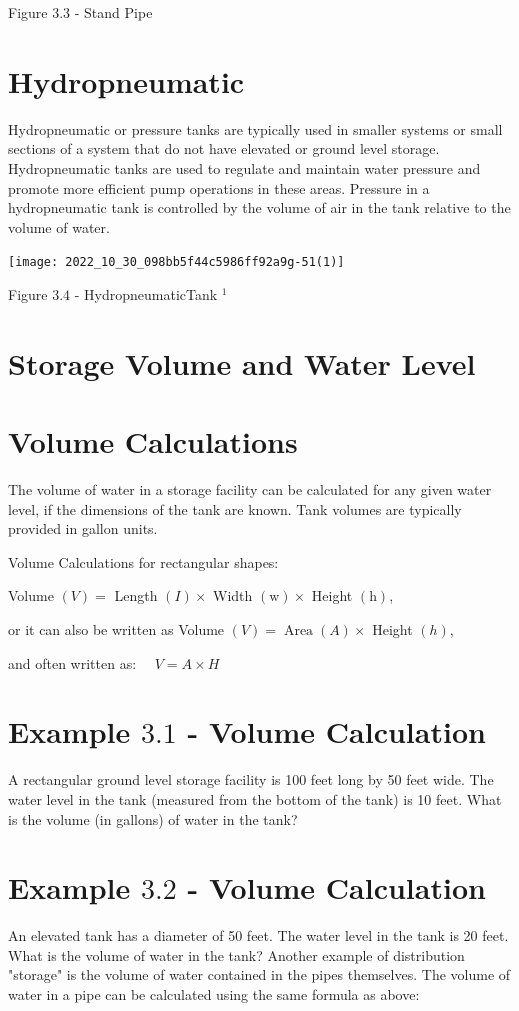 \documentclass[10pt]{article}
\begin{document}
Figure $3.3$ - Stand Pipe

\section{Hydropneumatic}
Hydropneumatic or pressure tanks are typically used in smaller systems or small sections of a system that do not have elevated or ground level storage. Hydropneumatic tanks are used to regulate and maintain water pressure and promote more efficient pump operations in these areas. Pressure in a hydropneumatic tank is controlled by the volume of air in the tank relative to the volume of water.

\texttt{[image: 2022\_10\_30\_098bb5f44c5986ff92a9g-51(1)]}

Figure $3.4$ - HydropneumaticTank ${ }^{1}$

\section{Storage Volume and Water Level}
\section{Volume Calculations}
The volume of water in a storage facility can be calculated for any given water level, if the dimensions of the tank are known. Tank volumes are typically provided in gallon units.

Volume Calculations for rectangular shapes:

Volume $(V)=$ Length $(I) \times$ Width $(\mathrm{w}) \times$ Height $(\mathrm{h})$,

or it can also be written as Volume $(V)=\operatorname{Area}(A) \times$ Height $(h)$,

and often written as: $\quad V=A \times H$

\section{Example $3.1$ - Volume Calculation}
A rectangular ground level storage facility is 100 feet long by 50 feet wide. The water level in the tank (measured from the bottom of the tank) is 10 feet. What is the volume (in gallons) of water in the tank?

\section{Example $3.2$ - Volume Calculation}
An elevated tank has a diameter of 50 feet. The water level in the tank is 20 feet. What is the volume of water in the tank? Another example of distribution "storage" is the volume of water contained in the pipes themselves. The volume of water in a pipe can be calculated using the same formula as above:
\end{document}

